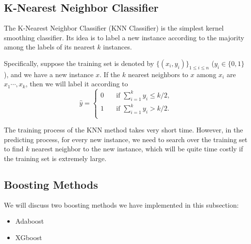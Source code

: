 \documentclass[english]{article}
\begin{document}
\subsection{K-Nearest Neighbor Classifier}
\par The K-Nearest Neighbor Classifier (KNN Classifier) is the simplest kernel smoothing classifier. Its idea is to label a new instance according to the majority among the labels of its nearest $k$ instances.
\par Specifically, suppose the training set is denoted by $\{(x_{i}, y_{i})\}_{1\le i\le n}$ ($y_{i}\in\{0, 1\}$), and we have a new instance $x$. If the $k$ nearest neighbors to $x$ among $x_{i}$ are $x_{1}\cdots, x_{k}$, then we will label it according to
\begin{equation}
	\hat{y} = \begin{cases}
		0 & \quad \text{if }\sum_{i=1}^{k}y_{i}\le k / 2,\\
		1 & \quad \text{if }\sum_{i=1}^{k}y_{i}> k / 2.\\
	\end{cases}
\end{equation}
\par The training process of the KNN method takes very short time. However, in the predicting process, for every new instance, we need to search over the training set to find $k$ nearest neighbor to the new instance, which will be quite time costly if the training set is extremely large.

\subsection{Boosting Methods}
\par We will discuss two boosting methods we have implemented in this subsection:
\begin{itemize}
	\item Adaboost
	\item XGboost
\end{itemize}
\end{document}
